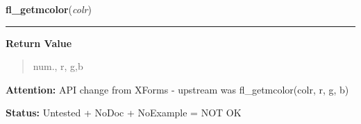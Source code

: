     \label{xformslib:library:fl_getmcolor}

    \vspace{0.5ex}

\hspace{.8\funcindent}\begin{boxedminipage}{\funcwidth}

    \raggedright \textbf{fl\_getmcolor}(\textit{colr})

    \vspace{-1.5ex}

    \rule{\textwidth}{0.5\fboxrule}
\setlength{\parskip}{2ex}
\setlength{\parskip}{1ex}
      \textbf{Return Value}
    \vspace{-1ex}

      \begin{quote}
      num., r, g,b

      \end{quote}

\textbf{Attention:} API change from XForms - upstream was fl\_getmcolor(colr, r, g, b)



\textbf{Status:} Untested + NoDoc + NoExample = NOT OK



    \end{boxedminipage}

    \label{xformslib:library:fl_get_pixel}

    \vspace{0.5ex}

